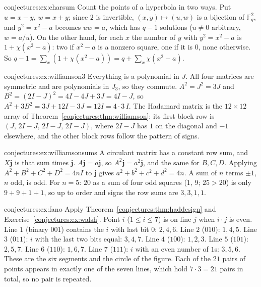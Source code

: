 \begin{solution}{conjectures:ex:charsum}
\idea Count the points of a hyperbola in two ways.
\writeup Put $u=x-y$, $w=x+y$; since $2$ is invertible, $(x,y)\mapsto(u,w)$ is a bijection of $\mathbb F_q^2$, and $y^2=x^2-a$ becomes $uw=a$, which has
$q-1$ solutions ($u\neq0$ arbitrary, $w=a/u$). On the other hand, for each $x$ the number of $y$ with $y^2=x^2-a$ is $1+\chi(x^2-a)$: two if $x^2-a$ is a
nonzero square, one if it is $0$, none otherwise. So $q-1=\sum_x(1+\chi(x^2-a))=q+\sum_x\chi(x^2-a)$.
\end{solution}

\begin{solution}{conjectures:ex:williamson3}
\idea Everything is a polynomial in $J$.
\writeup All four matrices are symmetric and are polynomials in $J_3$, so they commute. $A^2=J^2=3J$ and $B^2=(2I-J)^2=4I-4J+3J=4I-J$, so
$A^2+3B^2=3J+12I-3J=12I=4\cdot3\,I$. The Hadamard matrix is the $12\times12$ array of Theorem~\ref{conjectures:thm:williamson}: its first block row is
$(J,\,2I-J,\,2I-J,\,2I-J)$, where $2I-J$ has $1$ on the diagonal and $-1$ elsewhere, and the other block rows follow the pattern of signs.
\end{solution}

\begin{solution}{conjectures:ex:williamsonsums}
\idea A circulant matrix has a constant row sum, and $X\mathbf j$ is that sum times $\mathbf j$.
\writeup $A\mathbf j=a\mathbf j$, so $A^2\mathbf j=a^2\mathbf j$, and the same for $B,C,D$. Applying $A^2+B^2+C^2+D^2=4nI$ to $\mathbf j$ gives
$a^2+b^2+c^2+d^2=4n$. A sum of $n$ terms $\pm1$, $n$ odd, is odd. For $n=5$: $20$ as a sum of four odd squares ($1$, $9$; $25>20$) is only $9+9+1+1$, so
up to order and signs the row sums are $3,3,1,1$.
\end{solution}

\begin{solution}{conjectures:ex:fano}
\idea Apply Theorem~\ref{conjectures:thm:haddesign} and Exercise~\ref{conjectures:ex:walsh}.
\writeup Point $i$ ($1\le i\le7$) is on line $j$ when $i\cdot j$ is even. Line $1$ (binary $001$) contains the $i$ with last bit $0$: $2,4,6$. Line $2$
($010$): $1,4,5$. Line $3$ ($011$): $i$ with the last two bits equal: $3,4,7$. Line $4$ ($100$): $1,2,3$. Line $5$ ($101$): $2,5,7$. Line $6$ ($110$):
$1,6,7$. Line $7$ ($111$): $i$ with an even number of $1$s: $3,5,6$. These are the six segments and the circle of the figure. Each of the $21$ pairs of
points appears in exactly one of the seven lines, which hold $7\cdot3=21$ pairs in total, so no pair is repeated.
\end{solution}


